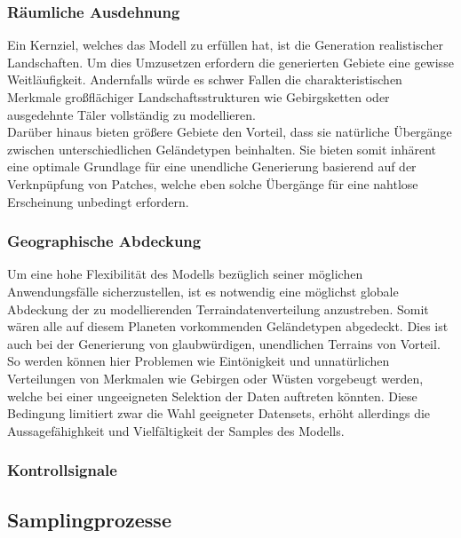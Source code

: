 \subsubsection {Räumliche Ausdehnung}

Ein Kernziel, welches das Modell zu erfüllen hat, ist die Generation realistischer Landschaften. Um dies Umzusetzen erfordern die generierten Gebiete eine gewisse Weitläufigkeit. Andernfalls würde es schwer Fallen die charakteristischen Merkmale großflächiger Landschaftsstrukturen wie Gebirgsketten oder ausgedehnte Täler vollständig zu modellieren. \\
Darüber hinaus bieten größere Gebiete den Vorteil, dass sie natürliche Übergänge zwischen unterschiedlichen Geländetypen beinhalten. Sie bieten somit inhärent eine optimale Grundlage für eine unendliche Generierung basierend auf der Verknpüpfung von Patches, welche eben solche Übergänge für eine nahtlose Erscheinung unbedingt erfordern.  

\subsubsection {Geographische Abdeckung}
\label{subsubsec:Geographische_Abdeckung}

Um eine hohe Flexibilität des Modells bezüglich seiner möglichen Anwendungsfälle sicherzustellen, ist es notwendig eine möglichst globale Abdeckung der zu modellierenden Terraindatenverteilung anzustreben. Somit wären alle auf diesem Planeten vorkommenden Geländetypen abgedeckt. Dies ist auch bei der Generierung von glaubwürdigen, unendlichen Terrains von Vorteil. So werden können hier Problemen wie Eintönigkeit und unnatürlichen Verteilungen von Merkmalen wie Gebirgen oder Wüsten vorgebeugt werden, welche bei einer ungeeigneten Selektion der Daten auftreten könnten. Diese Bedingung limitiert zwar die Wahl geeigneter Datensets, erhöht allerdings die Aussagefähighkeit und Vielfältigkeit der Samples des Modells.  

\subsubsection {Kontrollsignale}

\subsection {Samplingprozesse}

